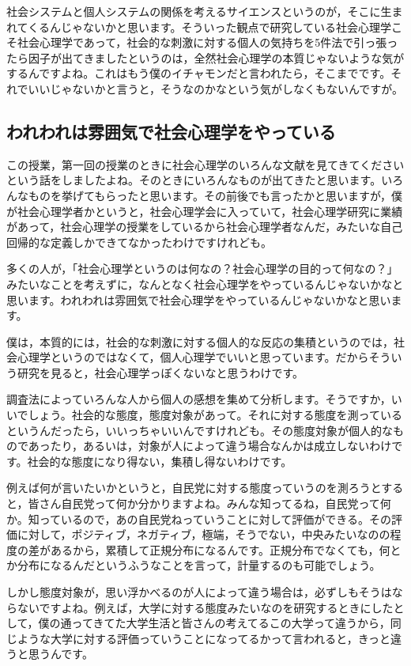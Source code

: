 \documentclass{ltjsbook}
\begin{document}
社会システムと個人システムの関係を考えるサイエンスというのが，そこに生まれてくるんじゃないかと思います。そういった観点で研究している社会心理学こそ社会心理学であって，社会的な刺激に対する個人の気持ちを5件法で引っ張ったら因子が出てきましたというのは，全然社会心理学の本質じゃないような気がするんですよね。これはもう僕のイチャモンだと言われたら，そこまでです。それでいいじゃないかと言うと，そうなのかなという気がしなくもないんですが。

\subsection{われわれは雰囲気で社会心理学をやっている}

この授業，第一回の授業のときに社会心理学のいろんな文献を見てきてくださいという話をしましたよね。そのときにいろんなものが出てきたと思います。いろんなものを挙げてもらったと思います。その前後でも言ったかと思いますが，僕が社会心理学者かというと，社会心理学会に入っていて，社会心理学研究に業績があって，社会心理学の授業をしているから社会心理学者なんだ，みたいな自己回帰的な定義しかできてなかったわけですけれども。

多くの人が，「社会心理学というのは何なの？社会心理学の目的って何なの？」みたいなことを考えずに，なんとなく社会心理学をやっているんじゃないかなと思います。われわれは雰囲気で社会心理学をやっているんじゃないかなと思います。

僕は，本質的には，社会的な刺激に対する個人的な反応の集積というのでは，社会心理学というのではなくて，個人心理学でいいと思っています。だからそういう研究を見ると，社会心理学っぽくないなと思うわけです。

調査法によっていろんな人から個人の感想を集めて分析します。そうですか，いいでしょう。社会的な態度，態度対象があって。それに対する態度を測っているというんだったら，いいっちゃいいんですけれども。その態度対象が個人的なものであったり，あるいは，対象が人によって違う場合なんかは成立しないわけです。社会的な態度になり得ない，集積し得ないわけです。

例えば何が言いたいかというと，自民党に対する態度っていうのを測ろうとすると，皆さん自民党って何か分かりますよね。みんな知ってるね，自民党って何か。知っているので，あの自民党ねっていうことに対して評価ができる。その評価に対して，ポジティブ，ネガティブ，極端，そうでない，中央みたいなのの程度の差があるから，累積して正規分布になるんです。正規分布でなくても，何とか分布になるんだというふうなことを言って，計量するのも可能でしょう。

しかし態度対象が，思い浮かべるのが人によって違う場合は，必ずしもそうはならないですよね。例えば，大学に対する態度みたいなのを研究するときにしたとして，僕の通ってきてた大学生活と皆さんの考えてるこの大学って違うから，同じような大学に対する評価っていうことになってるかって言われると，きっと違うと思うんです。
\end{document}
